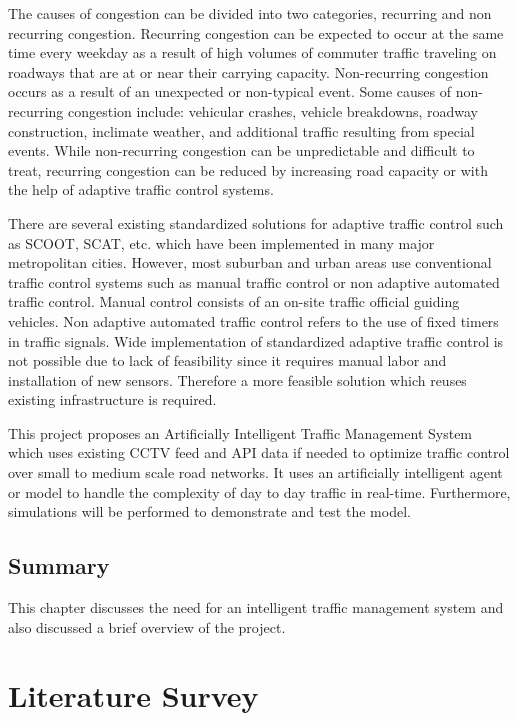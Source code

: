 \documentclass[openany,12pt]{report}
\begin{document}
	The causes of congestion can be divided into two categories, recurring and non recurring congestion. Recurring congestion can be expected to occur at the same time every weekday as a result of high volumes of commuter traffic traveling on roadways that are at or near their carrying capacity. Non-recurring congestion occurs as a result of an unexpected or non-typical event. Some causes of non-recurring congestion include: vehicular crashes, vehicle breakdowns, roadway construction, inclimate weather, and additional traffic resulting from special events. While non-recurring congestion can be unpredictable and difficult to treat, recurring congestion can be reduced by increasing road capacity or with the help of adaptive traffic control systems.
	
	There are several existing standardized solutions for adaptive traffic control such as SCOOT, SCAT, etc. which have been implemented in many major metropolitan cities. However, most suburban and urban areas use conventional traffic control systems such as manual traffic control or non adaptive automated traffic control. Manual control consists of an on-site traffic official guiding vehicles. Non adaptive automated traffic control refers to the use of fixed timers in traffic signals. Wide implementation of standardized adaptive traffic control is not possible due to lack of feasibility since it requires manual labor and installation of new sensors. Therefore a more feasible solution which reuses existing infrastructure is required.
	
	This project proposes an Artificially Intelligent Traffic Management System which uses existing CCTV feed and API data if needed to optimize traffic control over small to medium scale road networks. It uses an artificially intelligent agent or model to handle the complexity of day to day traffic in real-time. Furthermore, simulations will be performed to demonstrate and test the model.\\
	
	\section{Summary}
	\hspace*{0.5in}This chapter discusses the need for an intelligent traffic management system and also discussed a brief overview of the project.\\
	\chapter{Literature Survey}
	
\end{document}
